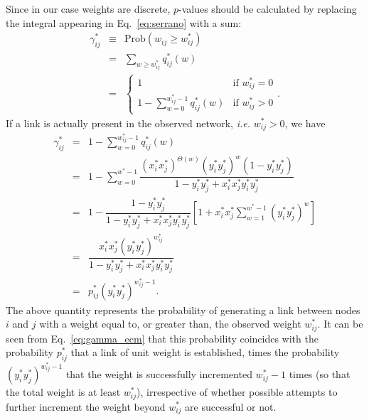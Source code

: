 \documentclass[aps,twocolumn,superscriptaddress]{revtex4-1}
\newcommand{\ie}{\emph{i.e.} }
\newcommand{\xxi}{x_i}
\newcommand{\xxj}{x_j}
\newcommand{\yyi}{y_i}
\newcommand{\yyj}{y_j}
\begin{document}
Since in our case weights are discrete, $p$-values should be calculated by replacing the integral appearing in Eq.~\eqref{eq:serrano} with a sum:
\begin{eqnarray}
\gamma_{ij}^{\ast} &\equiv& \textrm{Prob}(w_{ij} \geq w_{ij}^{\ast}) \nonumber\\
&=& \sum_{w \geq w_{ij}^{\ast}} q^{\ast}_{ij} (w) \nonumber\\
&=& \left\{
    \begin{array}{ll}
      1 & \textrm{if  } w_{ij}^{\ast} = 0 \\
      1 - \sum_{w = 0}^{w_{ij}^{\ast}-1} q^{\ast}_{ij}(w) & \textrm{if  } w_{ij}^{\ast} > 0
     \end{array}
  \right. .
\end{eqnarray}
If a link is actually present in the observed network, \ie $w_{ij}^{\ast} > 0$, we have
\begin{eqnarray}
\gamma^{\ast}_{ij} & = & 1 - \sum_{w = 0}^{w_{ij}^{\ast}-1} q^{\ast}_{ij}(w)  \nonumber \\
            & = & 1 - \sum_{w = 0}^{w^{\ast}-1} \dfrac{\left( \xxi^{\ast} \xxj^{\ast} \right)^{\Theta(w)} \left( \yyi^{\ast} \yyj^{\ast} \right)^{w}  \left( 1 - \yyi^{\ast} \yyj^{\ast} \right) }{1 - \yyi^{\ast} \yyj^{\ast} + \xxi^{\ast} \xxj^{\ast} \yyi^{\ast} \yyj^{\ast}} \nonumber \\
            & = & 1 - \dfrac{ 1 - \yyi^{\ast} \yyj^{\ast} }{1 - \yyi^{\ast} \yyj^{\ast} + \xxi^{\ast} \xxj^{\ast} \yyi^{\ast} \yyj^{\ast}} \left[ 1 + \xxi^{\ast} \xxj^{\ast} \sum_{w = 1}^{w^{\ast}-1} \left( \yyi^{\ast} \yyj^{\ast} \right)^{w} \right]  \nonumber \\
            & = &  \dfrac{\xxi^{\ast} \xxj^{\ast} \left( \yyi^{\ast} \yyj^{\ast} \right)^{w_{ij}^{\ast}}}{1 - \yyi^{\ast} \yyj^{\ast} + \xxi^{\ast} \xxj^{\ast} \yyi^{\ast} \yyj^{\ast}}\nonumber\\
&=&p^\ast_{ij}\left( \yyi^{\ast} \yyj^{\ast} \right)^{w_{ij}^{\ast}-1}.
\label{eq:gamma_ecm}
\end{eqnarray}
The above quantity represents the probability of generating a link between nodes $i$ and $j$ with a weight equal to, or greater than, the observed weight $w_{ij}^\ast$. It can be seen from Eq.~\eqref{eq:gamma_ecm} that this probability coincides with the probability $p^\ast_{ij}$ that a link of unit weight is established, times the probability $\left( \yyi^{\ast} \yyj^{\ast} \right)^{w_{ij}^{\ast}-1}$ that the weight is successfully incremented $w_{ij}^{\ast}-1$ times (so that the total weight is at least $w_{ij}^{\ast}$), irrespective of whether possible attempts to further increment the weight beyond $w_{ij}^{\ast}$ are successful or not.
\end{document}
